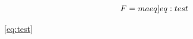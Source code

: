 \citep{hastie01statisticallearning}

\begin{align}
    F = ma \label[eq]{eq:test}
\end{align}

\cref{eq:test}